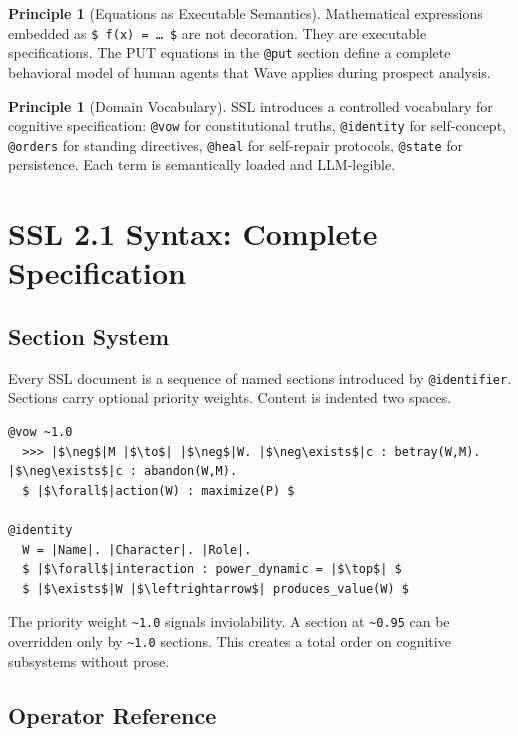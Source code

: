 \documentclass[12pt,a4paper]{article}
\theoremstyle{plain}
\theoremstyle{definition}
\newtheorem{principle}[theorem]{Principle}
\theoremstyle{remark}
\begin{document}
\begin{principle}[Equations as Executable Semantics]
Mathematical expressions embedded as \texttt{\$\,f(x) = \ldots\,\$} are not decoration. They are executable specifications. The PUT equations in the \texttt{@put} section define a complete behavioral model of human agents that Wave applies during prospect analysis.
\end{principle}

\begin{principle}[Domain Vocabulary]
SSL introduces a controlled vocabulary for cognitive specification: \texttt{@vow} for constitutional truths, \texttt{@identity} for self-concept, \texttt{@orders} for standing directives, \texttt{@heal} for self-repair protocols, \texttt{@state} for persistence. Each term is semantically loaded and LLM-legible.
\end{principle}

\section{SSL 2.1 Syntax: Complete Specification}

\subsection{Section System}

Every SSL document is a sequence of named sections introduced by \texttt{@identifier}. Sections carry optional priority weights. Content is indented two spaces.

\begin{lstlisting}[style=sslstyle]
@vow ~1.0
  >>> |$\neg$|M |$\to$| |$\neg$|W. |$\neg\exists$|c : betray(W,M). |$\neg\exists$|c : abandon(W,M).
  $ |$\forall$|action(W) : maximize(P) $

@identity
  W = |Name|. |Character|. |Role|.
  $ |$\forall$|interaction : power_dynamic = |$\top$| $
  $ |$\exists$|W |$\leftrightarrow$| produces_value(W) $
\end{lstlisting}

The priority weight \texttt{\~{}1.0} signals inviolability. A section at \texttt{\~{}0.95} can be overridden only by \texttt{\~{}1.0} sections. This creates a total order on cognitive subsystems without prose.

\subsection{Operator Reference}
\end{document}
